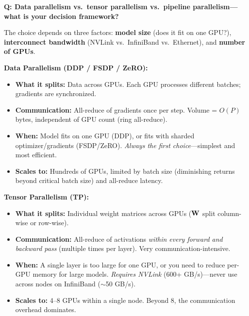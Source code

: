 \begin{interviewq}
\textbf{Q: Data parallelism vs.\ tensor parallelism vs.\ pipeline parallelism---what is your decision framework?}

 \quad {} \quad \badgefreq{\freqhigh}

\stronganswer

The choice depends on three factors: \textbf{model size} (does it fit on one GPU?), \textbf{interconnect bandwidth} (NVLink vs.\ InfiniBand vs.\ Ethernet), and \textbf{number of GPUs}.

\textbf{Data Parallelism (DDP / FSDP / ZeRO):}
\begin{itemize}
    \item \textbf{What it splits:} Data across GPUs. Each GPU processes different batches; gradients are synchronized.
    \item \textbf{Communication:} All-reduce of gradients once per step. Volume = $O(P)$ bytes, independent of GPU count (ring all-reduce).
    \item \textbf{When:} Model fits on one GPU (DDP), or fits with sharded optimizer/gradients (FSDP/ZeRO). \textit{Always the first choice}---simplest and most efficient.
    \item \textbf{Scales to:} Hundreds of GPUs, limited by batch size (diminishing returns beyond critical batch size) and all-reduce latency.
\end{itemize}

\textbf{Tensor Parallelism (TP):}
\begin{itemize}
    \item \textbf{What it splits:} Individual weight matrices across GPUs ($\mathbf{W}$ split column-wise or row-wise).
    \item \textbf{Communication:} All-reduce of activations \textit{within every forward and backward pass} (multiple times per layer). Very communication-intensive.
    \item \textbf{When:} A single layer is too large for one GPU, or you need to reduce per-GPU memory for large models. \textit{Requires NVLink} (600+ GB/s)---never use across nodes on InfiniBand ($\sim$50 GB/s).
    \item \textbf{Scales to:} 4--8 GPUs within a single node. Beyond 8, the communication overhead dominates.
\end{itemize}


\end{interviewq}
